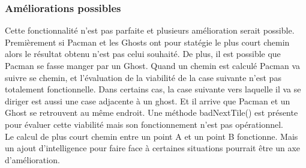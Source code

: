 \subsubsection{Améliorations possibles}

Cette fonctionnalité n'est pas parfaite et plusieurs amélioration serait possible. Premièrement si Pacman et les Ghosts ont pour statégie le plus court chemin alors le résultat obtenu n'est pas celui souhaité. De plus, il est possible que Pacman se fasse manger par un Ghost. Quand un chemin est calculé Pacman va suivre se chemin, et l'évaluation de la viabilité de la case suivante n'est pas totalement fonctionnelle. Dans certains cas, la case suivante vers laquelle il va se diriger est aussi une case adjacente à un ghost. Et il arrive que Pacman et un Ghost se retrouvent au même endroit. Une méthode badNextTile() est présente pour évaluer cette viabilité mais son fonctionnement n'est pas opérationnel.\\
Le calcul de plus court chemin entre un point A et un point B fonctionne. Mais un ajout d'intelligence pour faire face à certaines situations pourrait être un axe d'amélioration.